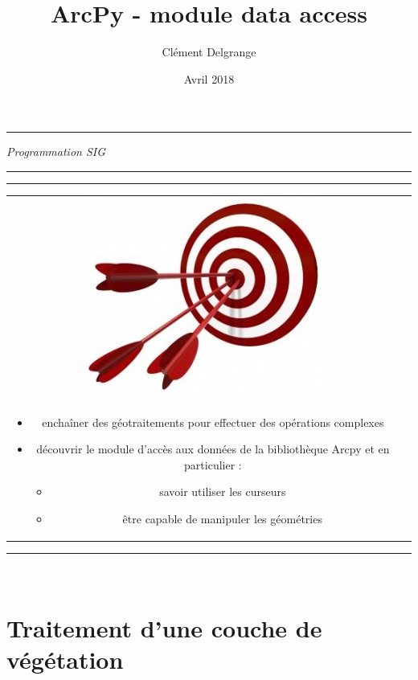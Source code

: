 \documentclass[11pt]{article}
\title{ArcPy - module data access}
\author{Clément Delgrange}
\date{Avril 2018}
\newenvironment{objectifs}{
  \hrule
	\begin{minipage}{0.9\textwidth}
		\vspace{1em}
		\begin{tabular}[t t]{c c}
			\includegraphics[width=0.1\linewidth]{img/goals.jpg} &
			\begin{minipage}[c]{0.8\linewidth}
				\hspace{2em}\textbf{\large{Objectifs :}} \\
}{
			\end{minipage}
		\end{tabular}
		\vspace{1em}
	\end{minipage}
	\hrule
}
\begin{document}
\parindent=0cm


\begin{titlepage}
\makeatletter
	\begin{sffamily}
		\begin{flushleft}
		\end{flushleft}
		\begin{flushright}
		\end{flushright}

		\vspace{4cm}

		\begin{center}
			\hrule
				\vspace{1em}
				{\small \textit{Programmation SIG}}\\
				\vspace{0.5cm}
				{\huge\bfseries \@title}
				\vspace{1cm}
			\hrule

			\vspace{3cm}
			\begin{objectifs}
			\begin{itemize}
				\item enchaîner des géotraitements pour effectuer des opérations complexes
				\item découvrir le module d'accès aux données de la bibliothèque Arcpy et en particulier :
				\begin{itemize}
					\item savoir utiliser les curseurs
					\item être capable de manipuler les géométries
				\end{itemize}
			\end{itemize}
			\end{objectifs}
			\vspace{4cm}

			\large \textit{\@author}\\
			\small \textit{\@date}
		\end{center}
	\end{sffamily}
\makeatother
\end{titlepage}



\section{Traitement d'une couche de végétation}
\end{document}
